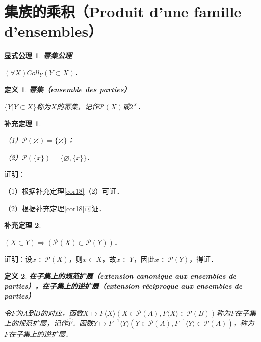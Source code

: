 \documentclass[12pt, a4paper, oneside]{book}
\newtheorem{ex}{显式公理}
\newtheorem{cor}{补充定理}
\newtheorem{de}{定义}
\begin{document}
		\section{集族的乘积（Produit d'une famille d'ensembles）}

			\begin{ex}\label{ex3}
				\textbf{幂集公理}
				\par
				$(\forall X)Coll_Y(Y\subset X)$．
			\end{ex}
			
			\begin{de}
				\textbf{幂集（ensemble des parties）}
				\par
				$\{Y|Y\subset X\}$称为$X$的幂集，记作$\mathcal{P}(X)$或$2^X$．
			\end{de}

			\begin{cor}\label{cor117}
				\hfill\par
				（1）$ \mathcal{P}(\varnothing)=\{\varnothing\}$；
				\par 
				（2）$ \mathcal{P}(\{x\})=\{\varnothing, \{x\}\}$．
			\end{cor}
			证明：
			\par
			（1）根据补充定理\ref{cor18}（2）可证．
			\par
			（2）根据补充定理\ref{cor18}可证．

			\begin{cor}\label{cor118}
				\hfill\par
				$(X\subset Y)\Rightarrow( \mathcal{P}(X)\subset \mathcal{P}(Y))$．
			\end{cor}
			证明：设$x\in \mathcal{P}(X)$，则$x\subset X$，故$x\subset Y$，因此$x\in \mathcal{P}(Y)$，得证．
			
			\begin{de}
				\textbf{在子集上的规范扩展（extension canonique aux ensembles de parties），在子集上的逆扩展（extension réciproque aux ensembles de parties）}
				\par
				令$F$为$A$到$B$的对应，函数$X\mapsto F\langle X \rangle (X\in \mathcal{P}(A), F\langle X \rangle \in \mathcal{P}(B))$称为$F$在子集上的规范扩展，记作$\hat{F}$．函数$Y\mapsto F^{-1}\langle Y \rangle (Y\in \mathcal{P}(A), F^{-1}\langle Y \rangle \in \mathcal{P}(A))$，称为$F$在子集上的逆扩展．
			\end{de}
			
\end{document}
